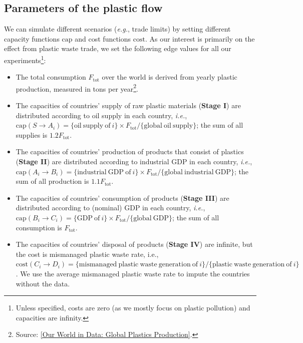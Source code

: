\subsection{Parameters of the plastic flow}

We can simulate different scenarios (\textit{e.g.}, trade limits) by setting different capacity functions $\mathrm{cap}$ and cost functions $\mathrm{cost}$. As our interest is primarily on the effect from plastic waste trade, we set the following edge values for all our experiments\footnote{Unless specified, costs are zero (as we mostly focus on plastic pollution) and capacities are infinity.}:
\begin{itemize}
    \item The total consumption $F_{\mathrm{tot}}$ over the world is derived from yearly plastic production, measured in tons per year\footnote{Source: \href{https://ourworldindata.org/grapher/global-plastics-production}{[Our World in Data: Global Plastics Production]}.}.
    \item The capacities of countries' supply of raw plastic materials (\textbf{Stage I}) are distributed according to oil supply in each country, \textit{i.e.}, $\mathrm{cap}(S \to A_i) = \{\mathrm{oil\ supply\ of\ } i\} \times F_{\mathrm{tot}} / \{\mathrm{global\ oil\ supply}\}$; the sum of all supplies is $1.2 F_{\mathrm{tot}}$.
    \item The capacities of countries' production of products that consist of plastics (\textbf{Stage II}) are distributed according to industrial GDP in each country, \textit{i.e.}, $\mathrm{cap}(A_i \to B_i) =  \{\mathrm{industrial\ GDP\ of\ } i\} \times F_{\mathrm{tot}} / \{\mathrm{global\ industrial\ GDP}\}$; the sum of all production is $1.1 F_{\mathrm{tot}}$.
    \item The capacities of countries' consumption of products (\textbf{Stage III}) are distributed according to (nominal) GDP in each country, \textit{i.e.}, $\mathrm{cap}(B_i \to C_i) = \{\mathrm{GDP\ of\ } i\} \times F_{\mathrm{tot}} / \{\mathrm{global\ GDP}\}$; the sum of all consumption is $F_{\mathrm{tot}}$.
    \item The capacities of countries' disposal of products (\textbf{Stage IV}) are infinite, but the cost is mismanaged plastic waste rate, i.e., $\mathrm{cost}(C_i \to D_i) = \{\mathrm{mismanaged\ plastic\ waste\ generation\ of\ } i\} / \{\mathrm{plastic\ waste\ generation\ of\ }i\}$. We use the average mismanaged plastic waste rate to impute the countries without the data.
\end{itemize}
